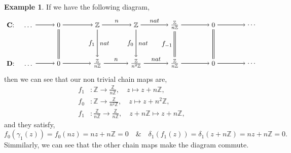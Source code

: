 \documentclass[11.5pt, twoside, a4paper, titlepage]{report}
\providecommand{\bb}[1]{\mathbb{#1}}
\theoremstyle{definition}
\newtheorem{eg}[mydef]{Example}
\theoremstyle{plain}
\begin{document}
\begin{eg}
If we have the following diagram,
\begin{equation*}
\begin{tikzpicture}[->,-latex, auto, main path/.style={->, semithick}, main node/.style={}]
\node	[main node]		(1) at (0,0)		{$\mathbf{C}$: \quad \dots};
\node	[main node]		(2) at (2,0)		{$0$};
\node	[main node]		(3) at (4,0)		{$\bb{Z}$};
\node [main node]		(4) at (6,0)		{$\bb{Z}$};
\node [main node]		(5) at (8,0)		{$\frac{\bb{Z}}{n\bb{Z}}$};
\node	[main node]		(11) at (10,0)	{$0$};
\node [main node] 		(12) at (12,0)	{\dots};
\node	[main node]		(6) at (0,-2)		{$\mathbf{D}$: \quad \dots};
\node	[main node]		(7) at (2,-2)		{$0$};
\node	[main node]		(8) at (4,-2)		{$\frac{\bb{Z}}{n\bb{Z}}$};
\node [main node]		(9) at (6,-2)		{$\frac{\bb{Z}}{n^2\bb{Z}}$};
\node [main node]		(10) at (8,-2)	{$\frac{\bb{Z}}{n\bb{Z}}$};
\node [main node]		(13) at (10,-2)	{$0$};
\node [main node]		(14) at (12,-2)	{\dots};

\draw (1) edge [main path] node [auto] {$$} (2);
\draw (2) edge [main path] node [auto] {$$} (3);
\draw (3) edge [main path] node [auto] {\small $n$} (4);
\draw (4) edge [main path] node [auto] {\small $nat$} (5);
\draw (5) edge [main path] (11);
\draw (11) edge [main path] (12);
\draw (6) edge [main path] node [auto] {$$} (7);
\draw (7) edge [main path] node [auto] {$$} (8);
\draw (8) edge [main path] node [auto] {\small $n$} (9);
\draw (9) edge [main path] node [auto] {\small $nat$} (10);
\draw (10) edge [main path] (13);
\draw (13) edge [main path] (14);
\draw (3) edge [main path] node [auto, swap] {$f_{1}$} node [auto] {\small $nat$} (8);
\draw (4) edge [main path] node [auto, swap] {$f_{0}$} node [auto] {\small $nat$} (9);
\draw (5) edge [-, semithick, double, double distance=1.5pt] node [auto, swap] {$f_{-1}$} (10);
\draw (11) edge [-, semithick, double, double distance=1.5pt] (13);
\draw (2) edge [-, semithick, double, double distance=1.5pt] (7);
\end{tikzpicture}
\end{equation*}
then we can see that our non trivial chain maps are, 
\begin{align*}
f_{1} &: \bb{Z} \to \frac{\bb{Z}}{n\bb{Z}}, \quad z \mapsto z+n\bb{Z},\\
f_0 &: \bb{Z} \to \frac{\bb{Z}}{n^2\bb{Z}}, \quad z \mapsto z+n^2\bb{Z}, \\
f_{1} &: \frac{\bb{Z}}{n\bb{Z}} \to \frac{\bb{Z}}{n\bb{Z}}, \quad z+n\bb{Z} \mapsto z+n\bb{Z}, 
\end{align*}
and they satisfy, 
\begin{equation*}
f_0(\gamma_1(z))=f_0(nz)=nz+n\bb{Z}=0\quad \& \quad \delta_1(f_1(z))=\delta_1(z+n\bb{Z})=nz+n\bb{Z}=0.
\end{equation*}
Simmilarly, we can see that the other chain maps make the diagram commute.
\end{eg}
\end{document}
